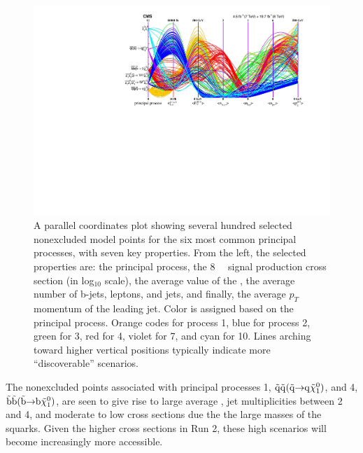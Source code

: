 \begin{figure}[h]
  \centering
         \includegraphics[width=1.0\linewidth]{figures/pMSSMpaper/parallel_coordinates/ParCorTopos.pdf}
    \caption{A parallel coordinates plot showing several hundred
      selected nonexcluded model points for the six most common
      principal processes, with seven key properties.
      From the left, the selected properties are: the principal
      process, the 8~\TeV~ signal production cross section (in
      log$_{\text{10}}$ scale), the average value of the \MET{}, the average number of
      b-jets, leptons, and jets, and finally, the average $p_{T}$
      momentum of the leading jet. Color is assigned based on the
      principal process. Orange codes for process 1, blue for
      process 2, green for 3, red for 4, violet for 7, and 
      cyan for 10.  Lines
      arching toward higher vertical positions typically indicate more
      ``discoverable'' scenarios. }
    \label{fig:parcor}
\end{figure}


The nonexcluded points associated with principal processes 1, $\tilde{\rm q}\tilde{\rm q}(\tilde{\rm q} \hspace{-1mm}\rightarrow \hspace{-1mm}{\rm q}\tilde{\chi}_{1}^{0})$, and 4, $\tilde{\rm b}\tilde{\rm b}(\tilde{\rm b} \hspace{-1mm}\rightarrow \hspace{-1mm}{\rm b}\tilde{\chi}_{1}^{0})$, are seen to give rise to large average \MET{}, jet multiplicities between 2 and 4, and moderate to low cross sections due the the large masses of the squarks. Given the
higher cross sections in Run 2, these high \MET{} scenarios will become increasingly more accessible.


